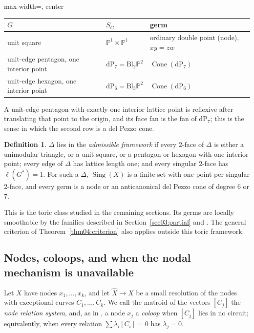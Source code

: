 \documentclass[11pt]{amsart}
\theoremstyle{definition}
\newtheorem{definition}[theorem]{Definition}
\theoremstyle{remark}
\theoremstyle{plain}
\newcommand{\PP}{\mathbb{P}}
\newcommand{\Cone}{\operatorname{Cone}}
\newcommand{\Sing}{\operatorname{Sing}}
\newcommand{\dP}{\mathrm{dP}}
\begin{document}
\begin{center}
\begin{adjustbox}{max width=\textwidth, center}
\begin{tabular}{lll}
\toprule
$G$ & $S_G$ & germ \\
\midrule
unit square & $\PP^1 \times \PP^1$ & ordinary double point (node), $xy = zw$ \\
unit-edge pentagon, one interior point & $\dP_7 = \mathrm{Bl}_2\PP^2$ & $\Cone(\dP_7)$ \\
unit-edge hexagon, one interior point & $\dP_6 = \mathrm{Bl}_3\PP^2$ & $\Cone(\dP_6)$ \\
\bottomrule
\end{tabular}
\end{adjustbox}
\end{center}

A unit-edge pentagon with exactly one interior lattice point is reflexive after
translating that point to the origin, and its face fan is the fan of $\dP_7$;
this is the sense in which the second row is a del Pezzo cone.

\begin{definition}\label{def:framework}
$\Delta$ lies in the \emph{admissible framework} if every $2$-face of $\Delta$
is either a unimodular triangle, or a unit square, or a pentagon or hexagon with
one interior point; every edge of $\Delta$ has lattice length one; and every
singular $2$-face has $\ell(G^*) = 1$.  For such a $\Delta$, $\Sing(X)$ is a
finite set with one point per singular $2$-face, and every germ is a node or an
anticanonical del Pezzo cone of degree $6$ or $7$.
\end{definition}

This is the toric class studied in the remaining sections.  Its germs
are locally smoothable by the families described in
Section~\ref{sec03:partial} and \cite{Altmann97}.  The general
criterion of Theorem~\ref{thm04:criterion} also applies outside this
toric framework.

\subsection{Nodes, coloops, and when the nodal mechanism is unavailable}
Let $X$ have nodes $x_1,\dots,x_k$, and let $\widehat X \to X$ be a small
resolution of the nodes with exceptional curves $C_1,\dots,C_k$.  We call the
matroid of the vectors $[C_j]$ the \emph{node relation system}, and, as in
\cite[\S\S1.1 and~5.3]{PaperIV}, a node $x_j$ a \emph{coloop} when $[C_j]$ lies
in no circuit; equivalently, when every relation $\sum\lambda_i[C_i]=0$ has
$\lambda_j = 0$.
\end{document}

